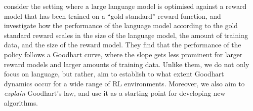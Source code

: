 \cite{gao_scaling_2022} consider the setting where a large language model is optimised against a reward model that has been trained on a \enquote{gold standard} reward function, and investigate how the performance of the language model according to the gold standard reward scales in the size of the language model, the amount of training data, and the size of the reward model.
They find that the performance of the policy follows a Goodhart curve, where the slope gets less prominent %
for larger reward models and larger amounts of training data.
Unlike them, we do not only focus on language, but rather, aim to establish to what extent Goodhart dynamics occur for a wide range of RL environments. Moreover, we also aim to \emph{explain} Goodhart's law, and use it as a starting point for developing new algorithms.
